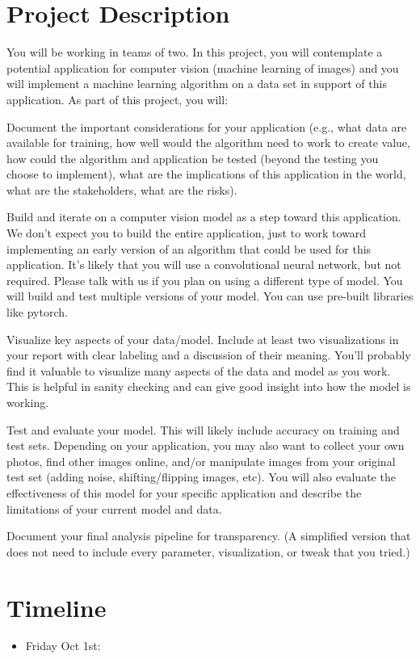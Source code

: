 \documentclass{tufte-handout}
\begin{document}
\section{Project Description}
You will be working in teams of two. In this project, you will contemplate a potential application for computer vision (machine learning of images) and you will implement a machine learning algorithm on a data set in support of this application. As part of this project, you will:
\bi[leftmargin=.5in]
\item Document the important considerations for your application (e.g., what data are available for training, how well would the algorithm need to work to create value, how could the algorithm and application be tested (beyond the testing you choose to implement), what are the implications of this application in the world, what are the stakeholders, what are the risks). 
\item Build and iterate on a computer vision model as a step toward this application. We don’t expect you to build the entire application, just to work toward implementing an early version of an algorithm that could be used for this application. It’s likely that you will use a convolutional neural network, but not required. Please talk with us if you plan on using a different type of model. You will build and test multiple versions of your model. You can use pre-built libraries like pytorch.
\item Visualize key aspects of your data/model. Include at least two visualizations in your report with clear labeling and a discussion of their meaning. You’ll probably find it valuable to visualize many aspects of the data and model as you work. This is helpful in sanity checking and can give good insight into how the model is working.
\item Test and evaluate your model. This will likely include accuracy on training and test sets. Depending on your application, you may also want to collect your own photos, find other images online, and/or manipulate images from your original test set (adding noise, shifting/flipping images, etc). You will also evaluate the effectiveness of this model for your specific application and describe the limitations of your current model and data.
\item Document your final analysis pipeline for transparency. (A simplified version that does not need to include every parameter, visualization, or tweak that you tried.)
\ei

\section{Timeline}
\begin{itemize}
\item Friday Oct 1st:
\end{itemize}
\end{document}

